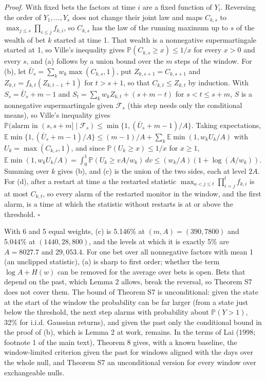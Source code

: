 \documentclass[
]{article}
\begin{document}
\emph{Proof.} With fixed bets the factors at time \(i\) are a fixed
function of \(Y_i\). Reversing the order of \(Y_1, \dots, Y_s\) does not
change their joint law and maps \(C_{k,s}\) to
\(\max_{j \le s}\prod_{i \le j} f_{k,i}\), so \(C_{k,s}\) has the law of
the running maximum up to \(s\) of the wealth of bet \(k\) started at
time 1. That wealth is a nonnegative supermartingale started at 1, so
Ville's inequality gives \(\mathbb{P}(C_{k,s} \ge x) \le 1/x\) for every
\(x > 0\) and every \(s\), and (a) follows by a union bound over the
\(m\) steps of the window. For (b), let
\(\bar U_s = \sum_k w_k\max(C_{k,s}, 1)\), put \(Z_{k,s+1} = C_{k,s+1}\)
and \(Z_{k,t} = f_{k,t}(Z_{k,t-1} + 1)\) for \(t > s + 1\), so that
\(C_{k,t} \le Z_{k,t}\) by induction. With \(S_s = \bar U_s + m - 1\)
and \(S_t = \sum_k w_k Z_{k,t} + (s + m - t)\) for \(s < t \le s + m\),
\(S\) is a nonnegative supermartingale given \(\mathcal{F}_s\) (this
step needs only the conditional means), so Ville's inequality gives
\(\mathbb{P}(\text{alarm in } (s, s+m] \mid \mathcal{F}_s) \le \min\lbrace 1, (\bar U_s + m - 1)/A\rbrace\).
Taking expectations,
\(\mathbb{E}\min\lbrace 1, (\bar U_s + m - 1)/A\rbrace \le (m - 1)/A + \sum_k\mathbb{E}\min(1, w_k U_k/A)\)
with \(U_k = \max(C_{k,s}, 1)\), and since
\(\mathbb{P}(U_k \ge x) \le 1/x\) for \(x \ge 1\),
\(\mathbb{E}\min(1, w_k U_k/A) = \int_0^1 \mathbb{P}(U_k \ge vA/w_k)\,dv \le (w_k/A)(1 + \log(A/w_k))\).
Summing over \(k\) gives (b), and (c) is the union of the two sides,
each at level \(2A\). For (d), after a restart at time \(a\) the
restarted statistic \(\max_{a < j \le t}\prod_{i=j}^{t} f_{k,i}\) is at
most \(C_{k,t}\), so every alarm of the restarted monitor in the window,
and the first alarm, is a time at which the statistic without restarts
is at or above the threshold. \(\square\)

With 6 and 5 equal weights, (c) is 5.146\% at \((m, A) = (390, 7800)\)
and 5.044\% at \((1440, 28{,}800)\), and the levels at which it is
exactly 5\% are \(A = 8027.7\) and \(29{,}053.4\). For one bet over all
nonnegative factors with mean 1 (an unclipped statistic), (a) is sharp
to first order; whether the term \(\log A + H(w)\) can be removed for
the average over bets is open. Bets that depend on the past, which Lemma
2 allows, break the reversal, so Theorem S7 does not cover them. The
bound of Theorem S7 is unconditional: given the state at the start of
the window the probability can be far larger (from a state just below
the threshold, the next step alarms with probability about
\(\mathbb{P}(Y > 1)\), 32\% for i.i.d. Gaussian returns), and given the
past only the conditional bound in the proof of (b), which is Lemma 2 at
work, remains. In the terms of Lai (1998; footnote 1 of the main text),
Theorem 8 gives, with a known baseline, the window-limited criterion
given the past for windows aligned with the days over the whole null,
and Theorem S7 an unconditional version for every window over
exchangeable nulls.
\end{document}
